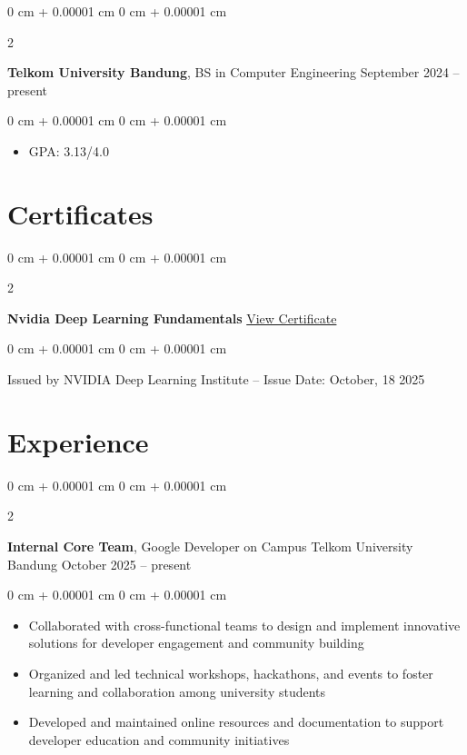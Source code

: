 \documentclass[10pt, a4paper]{article}
\newenvironment{highlights}{
    \begin{itemize}[
        topsep=0.10 cm,
        parsep=0.10 cm,
        partopsep=0pt,
        itemsep=0pt,
        leftmargin=0 cm + 10pt
    ]
}{
    \end{itemize}
} %
\newenvironment{onecolentry}{
    \begin{adjustwidth}{
        0 cm + 0.00001 cm
    }{
        0 cm + 0.00001 cm
    }
}{
    \end{adjustwidth}
} %
\newenvironment{twocolentry}[2][]{
    \onecolentry
    \def\secondColumn{#2}
    \setcolumnwidth{\fill, 4.5 cm}
    \begin{paracol}{2}
}{
    \switchcolumn \raggedleft \secondColumn
    \end{paracol}
    \endonecolentry
} %
\begin{document}
        \begin{twocolentry}{
            September 2024 – present
        }
            \textbf{Telkom University Bandung}, BS in Computer Engineering\end{twocolentry}

        \vspace{0.10 cm}
        \begin{onecolentry}
            \begin{highlights}
                \item GPA: 3.13/4.0
            \end{highlights}
        \end{onecolentry}


    
    \section{Certificates}
        \begin{twocolentry}{
            \href{https://learn.nvidia.com/certificates?id=1obDtIR5SJWcCdQ3BAuFSg}{View Certificate}
        }
            \textbf{Nvidia Deep Learning Fundamentals}\end{twocolentry}

        \vspace{0.10 cm}
        \begin{onecolentry}
            Issued by NVIDIA Deep Learning Institute – Issue Date: October, 18 2025
        \end{onecolentry}

    \section{Experience}

      \begin{twocolentry}{
            October 2025 – present
        }
            \textbf{Internal Core Team}, Google Developer on Campus Telkom University Bandung\end{twocolentry}
        \vspace{0.10 cm}
        \begin{onecolentry}
            \begin{highlights}
                \item Collaborated with cross-functional teams to design and implement innovative solutions for developer engagement and community building
                \item Organized and led technical workshops, hackathons, and events to foster learning and collaboration among university students
                \item Developed and maintained online resources and documentation to support developer education and community initiatives
            \end{highlights}
        \end{onecolentry}
    
\end{document}
